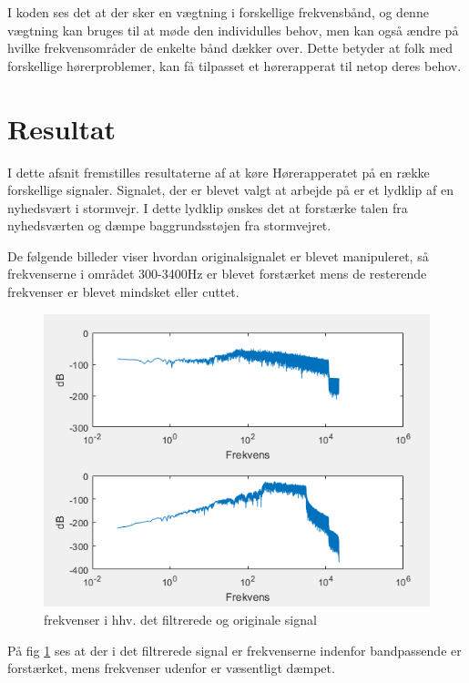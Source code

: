 I koden ses det at der sker en vægtning i forskellige frekvensbånd, og denne vægtning kan bruges til at møde den individulles behov, men kan også ændre på hvilke frekvensområder de enkelte bånd dækker over. Dette betyder at folk med forskellige hørerproblemer, kan få tilpasset et hørerapperat til netop deres behov.

\newpage
\section{Resultat}
I dette afsnit fremstilles resultaterne af at køre Hørerapperatet på en række forskellige signaler. Signalet, der er blevet valgt at arbejde på er et lydklip af en nyhedsvært i stormvejr. I dette lydklip ønskes det at forstærke talen fra nyhedsværten og dæmpe baggrundsstøjen fra stormvejret.


De følgende billeder viser hvordan originalsignalet er blevet manipuleret, så frekvenserne i området 300-3400Hz er blevet forstærket mens de resterende frekvenser er blevet mindsket eller cuttet.   


\begin{figure}[H]
	\centering
	\includegraphics[width=150mm]{figures/hoereapparat_resultat.PNG}
	\caption{frekvenser i hhv. det filtrerede og originale signal}
	\label{fig:Samlet frekvensplot}
\end{figure}


På fig \ref{fig:Samlet frekvensplot} ses at der i det filtrerede signal er frekvenserne indenfor bandpassende er forstærket, mens frekvenser udenfor er væsentligt dæmpet.\\




